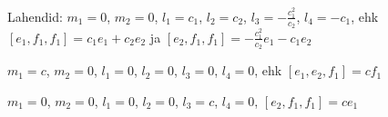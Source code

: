 Lahendid:
$m_1 = 0$,
$m_2 = 0$,
$l_1 = c_1$,
$l_2 = c_2$,
$l_3 = -\frac{c_1^2}{c_2}$,
$l_4 = -c_1$,
ehk
$\left[ e_1, f_1, f_1 \right] = c_1 e_1 + c_2 e_2$ ja
$\left[ e_2, f_1, f_1 \right] = -\frac{c_1^2}{c_2} e_1 - c_1 e_2$

$m_1 = c$,
$m_2 = 0$,
$l_1 = 0$,
$l_2 = 0$,
$l_3 = 0$,
$l_4 = 0$,
ehk
$\left[ e_1, e_2, f_1 \right] = c f_1$

$m_1 = 0$,
$m_2 = 0$,
$l_1 = 0$,
$l_2 = 0$,
$l_3 = c$,
$l_4 = 0$,
$\left[ e_2, f_1, f_1 \right] = c e_1$
